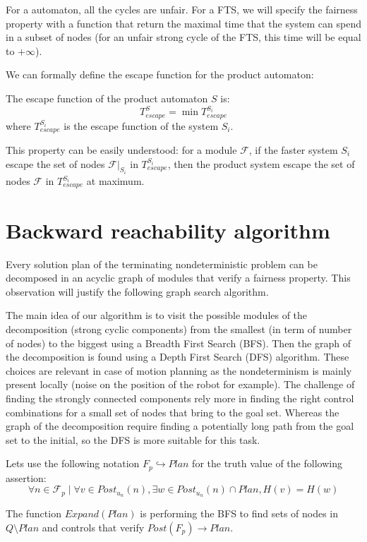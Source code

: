 For a \buchi{} automaton, all the cycles are unfair.
For a FTS, we will specify the fairness property with a function that return the maximal time that the system can spend in a subset of nodes
(for an unfair strong cycle of the FTS, this time will be equal to $+\infty$).

We can formally define the escape function for the product automaton:
\begin{property}
The escape function of the product automaton $S$ is:
$$T_{escape}^S = \min{T_{escape}^{S_i}}$$
where $T_{escape}^{S_i}$ is the escape function of the system $S_i$.
\end{property}
This property can be easily understood: for a module $\mathcal{F}$, if the faster system $S_i$ escape the set of nodes $\mathcal{F}|_{S_i}$ in $T^{S_i}_{escape}$, then the product system escape the set of nodes $\mathcal{F}$ in $T^{S_i}_{escape}$ at maximum.

\section{Backward reachability algorithm}
Every solution plan of the terminating nondeterministic problem can be decomposed in an acyclic graph of modules that verify a fairness property.
This observation will justify the following graph search algorithm.

The main idea of our algorithm is to visit the possible modules of the decomposition (strong cyclic components) from the smallest (in term of number of nodes) to the biggest using a Breadth First Search (BFS).
Then the graph of the decomposition is found using a Depth First Search (DFS) algorithm.
These choices are relevant in case of motion planning as the nondeterminism is mainly present locally (noise on the position of the robot for example). The challenge of finding the strongly connected components rely more in finding the right control combinations for a small set of nodes that bring to the goal set.
Whereas the graph of the decomposition require finding a potentially long path from the goal set to the initial, so the DFS is more suitable for this task.

Lets use the following notation $F_p \hookrightarrow Plan$ for the truth value of the following assertion:
$$\forall n \in \mathcal{F}_p \mid \forall v \in Post_{u_n}(n), \exists w \in Post_{u_n}(n) \cap Plan, H(v)=H(w)$$

The function $Expand(Plan)$ is performing the BFS to find sets of nodes in $Q \setminus Plan$ and controls that verify $Post(F_p) \rightarrow Plan$.

